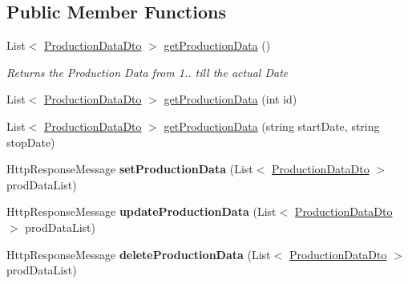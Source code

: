 \subsection*{Public Member Functions}
\begin{DoxyCompactItemize}
\item 
List$<$ \hyperlink{classkpi_mvc_api_1_1_data_transfer_objects_1_1_production_data_dto}{Production\+Data\+Dto} $>$ \hyperlink{classkpi_mvc_api_1_1_controllers_1_1_kpidata_controller_a0ab15672f7d3b5a077a8c4b0612feab8}{get\+Production\+Data} ()
\begin{DoxyCompactList}\small\item\em Returns the Production Data from 1.. till the actual Date \end{DoxyCompactList}\item 
List$<$ \hyperlink{classkpi_mvc_api_1_1_data_transfer_objects_1_1_production_data_dto}{Production\+Data\+Dto} $>$ \hyperlink{classkpi_mvc_api_1_1_controllers_1_1_kpidata_controller_a2cc4fffc5f66a92f16f917715cb36d0e}{get\+Production\+Data} (int id)
\item 
List$<$ \hyperlink{classkpi_mvc_api_1_1_data_transfer_objects_1_1_production_data_dto}{Production\+Data\+Dto} $>$ \hyperlink{classkpi_mvc_api_1_1_controllers_1_1_kpidata_controller_a27722d65abe0781d4b670c84c2e07a76}{get\+Production\+Data} (string start\+Date, string stop\+Date)
\item 
\mbox{\label{classkpi_mvc_api_1_1_controllers_1_1_kpidata_controller_a7f6c6c359f37a9b9a83d481b5c26a037}} 
Http\+Response\+Message {\bfseries set\+Production\+Data} (List$<$ \hyperlink{classkpi_mvc_api_1_1_data_transfer_objects_1_1_production_data_dto}{Production\+Data\+Dto} $>$ prod\+Data\+List)
\item 
\mbox{\label{classkpi_mvc_api_1_1_controllers_1_1_kpidata_controller_a82f308e9ae4809dfdca3ce685af05774}} 
Http\+Response\+Message {\bfseries update\+Production\+Data} (List$<$ \hyperlink{classkpi_mvc_api_1_1_data_transfer_objects_1_1_production_data_dto}{Production\+Data\+Dto} $>$ prod\+Data\+List)
\item 
\mbox{\label{classkpi_mvc_api_1_1_controllers_1_1_kpidata_controller_af1c1e99336a8408bbe4b637cfaaddc4b}} 
Http\+Response\+Message {\bfseries delete\+Production\+Data} (List$<$ \hyperlink{classkpi_mvc_api_1_1_data_transfer_objects_1_1_production_data_dto}{Production\+Data\+Dto} $>$ prod\+Data\+List)

\end{DoxyCompactItemize}
